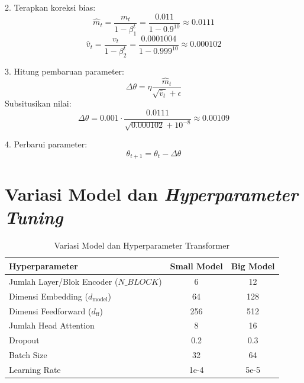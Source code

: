 2. Terapkan koreksi bias:
\[
\hat{m}_t = \frac{m_t}{1 - \beta_1^t} = \frac{0.011}{1 - 0.9^{10}} \approx 0.0111
\]
\[
\hat{v}_t = \frac{v_t}{1 - \beta_2^t} = \frac{0.0001004}{1 - 0.999^{10}} \approx 0.000102
\]

3. Hitung pembaruan parameter:
\[
\Delta \theta = \eta \frac{\hat{m}_t}{\sqrt{\hat{v}_t} + \epsilon}
\]
Subsitusikan nilai:
\[
\Delta \theta = 0.001 \cdot \frac{0.0111}{\sqrt{0.000102} + 10^{-8}} \approx 0.00109
\]

4. Perbarui parameter:
\[
\theta_{t+1} = \theta_t - \Delta \theta
\]

\chapter{Variasi Model dan \textit{Hyperparameter Tuning}} \label{lampiran B}
 \begin{table}[ht]
    \centering
    \caption{Variasi Model dan Hyperparameter Transformer}
    \begin{tabular}{@{}lcc@{}}
        \toprule
        \textbf{Hyperparameter} & \textbf{Small Model} & \textbf{Big Model} \\ \midrule
        Jumlah Layer/Blok Encoder ($N\_BLOCK$)      & 6                   & 12                 \\
        Dimensi Embedding ($d_\text{model}$) & 64                 & 128               \\
        Dimensi Feedforward ($d_\text{ff}$) & 256                & 512               \\
        Jumlah Head Attention  & 8                   & 16                 \\
        Dropout                & 0.2                 & 0.3                \\
        Batch Size             & 32                  & 64                \\
        Learning Rate          & 1e-4                & 5e-5               \\ \bottomrule
    \end{tabular}
    \label{tab:transformer-variations}
\end{table}